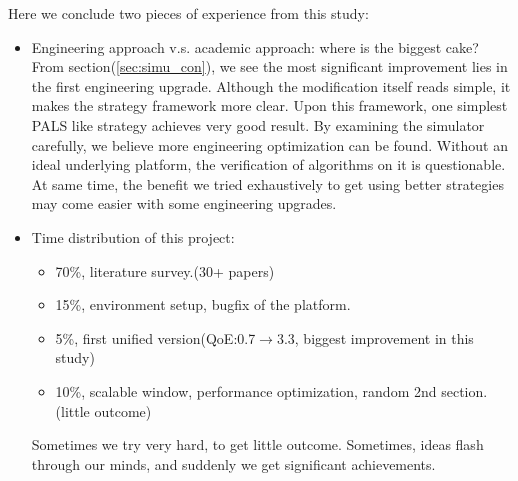 \documentclass[11pt,a4paper]{article}
\begin{document}
Here we conclude two pieces of experience from this study:
	\begin{itemize}
		\item Engineering approach v.s. academic approach:
		where is the biggest cake? From section(\ref{sec:simu_con}), 
		we see the most significant improvement lies in the first 
		engineering upgrade. Although the modification itself reads simple, 
		it makes the strategy framework more clear. Upon this framework, 
		one simplest PALS like strategy achieves very good result. 
		By examining the simulator carefully, we believe more engineering 
		optimization can be found. Without an ideal underlying 
		platform, the verification of algorithms on it is questionable. 
		At same time, the benefit we tried exhaustively to get 
		using better strategies may come easier with some engineering 
		upgrades. 
		\item Time distribution of this project:
			\begin{itemize}
				\item 70\%, literature survey.(30+ papers) 
				\item 15\%, environment setup, bugfix of the platform. 
				\item 5\%, first unified version(QoE:0.7$\rightarrow$3.3, 
				biggest improvement in this study)
				\item 10\%, scalable window, performance optimization, random 
				2nd section. (little outcome)
			\end{itemize}
		Sometimes we try very hard, to get little outcome. Sometimes, 
		ideas flash through our minds, and suddenly we get significant 
		achievements. 
	\end{itemize}

\end{document}
